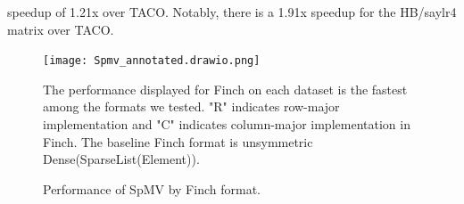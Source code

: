  speedup of 1.21x over TACO. Notably, there is a 1.91x speedup for the HB/saylr4 matrix over TACO. 






\begin{figure}
    \texttt{[image: Spmv\_annotated.drawio.png]}
    \caption{Performance of SpMV by Finch format.}
    \label{fig:spmv_grouped}
    \footnotesize The performance displayed for Finch on each dataset is the fastest among the formats we tested. "R" indicates row-major implementation and "C" indicates column-major implementation in Finch. The baseline Finch format is unsymmetric Dense(SparseList(Element)).
\end{figure}

